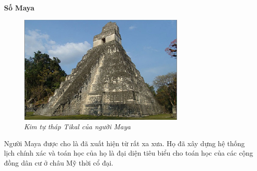 	\vskip 0.1cm
	\textbf{\color{toancuabi}Số Maya}
	\vskip 0.1cm
	\begin{figure}
		\centering
		\vspace*{-10pt}
		\captionsetup{labelformat= empty, justification=centering}
		\includegraphics[width=1\linewidth]{28}
		\caption{\textit{\color{toancuabi}Kim tự tháp Tikal của người Maya}}
		\vspace*{-15pt}
	\end{figure}
	Người Maya  được cho là đã xuất hiện từ rất xa xưa. Họ đã xây dựng hệ thống lịch chính xác và toán học của họ là đại diện tiêu biểu cho toán học của các cộng đồng dân cư ở châu Mỹ thời cổ đại.
	

